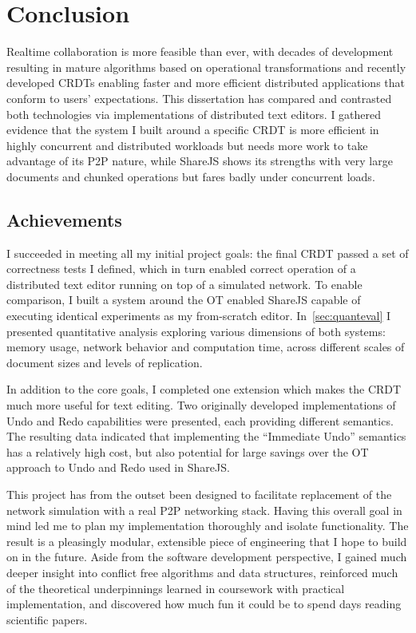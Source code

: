 \documentclass[12pt,a4paper,twoside,openright]{report}
\begin{document}
\chapter{Conclusion}

Realtime collaboration is more feasible than ever, with decades of development resulting in mature algorithms based on operational transformations and recently developed CRDTs enabling faster and more efficient distributed applications that conform to users' expectations. This dissertation has compared and contrasted both technologies via implementations of distributed text editors. I gathered evidence that the system I built around a specific CRDT is more efficient in highly concurrent and distributed workloads but needs more work to take advantage of its P2P nature, while ShareJS shows its strengths with very large documents and chunked operations but fares badly under concurrent loads.

\section{Achievements}

I succeeded in meeting all my initial project goals: the final CRDT passed a set of correctness tests I defined, which in turn enabled correct operation of a distributed text editor running on top of a simulated network. To enable comparison, I built a system around the OT enabled ShareJS capable of executing identical experiments as my from-scratch editor. In~\cref{sec:quanteval} I presented quantitative analysis exploring various dimensions of both systems: memory usage, network behavior and computation time, across different scales of document sizes and levels of replication. 

In addition to the core goals, I completed one extension which makes the CRDT much more useful for text editing. Two originally developed implementations of Undo and Redo capabilities were presented, each providing different semantics. The resulting data indicated that implementing the ``Immediate Undo'' semantics has a relatively high cost, but also potential for large savings over the OT approach to Undo and Redo used in ShareJS.

This project has from the outset been designed to facilitate replacement of the network simulation with a real P2P networking stack. Having this overall goal in mind led me to plan my implementation thoroughly and isolate functionality. The result is a pleasingly modular, extensible piece of engineering that I hope to build on in the future. Aside from the software development perspective, I gained much deeper insight into conflict free algorithms and data structures, reinforced much of the theoretical underpinnings learned in coursework with practical implementation, and discovered how much fun it could be to spend days reading scientific papers.
\end{document}
